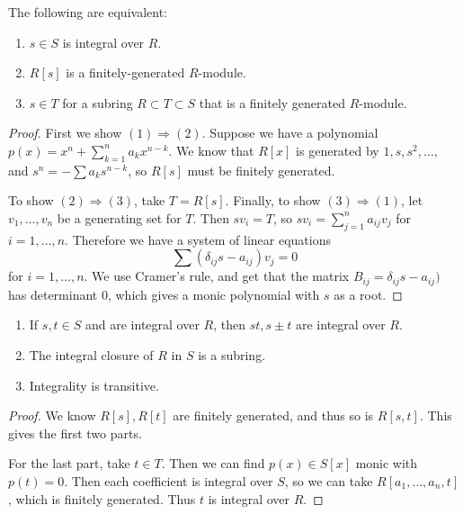\message{ !name(notes.tex)}\documentclass[10pt, twoside]{article}
\begin{document}
        \begin{prop}
            The following are equivalent:
            \begin{enumerate}
                \item $s \in S$ is integral over $R$.
                \item $R[s]$ is a finitely-generated $R$-module.
                \item $s \in T$ for a subring $R \subset T \subset S$ that is a finitely generated $R$-module.
            \end{enumerate}
            \begin{proof}
                First we show $(1) \Rightarrow (2)$. Suppose we have a polynomial $p(x) = x^n + \sum_{k=1}^n a_kx^{n-k}$. We know that $R[x]$ is generated by $1,s,s^2, \ldots,$ and $s^n = - \sum a_k s^{n-k}$, so $R[s]$ must be finitely generated.

                To show $(2) \Rightarrow (3)$, take $T = R[s]$. Finally, to show $(3) \Rightarrow (1)$, let $v_1, \ldots, v_n$ be a generating set for $T$. Then $sv_i = T$, so $sv_i = \sum_{j=1}^n a_{ij}v_j$ for $i = 1, \ldots, n$. Therefore we have a system of linear equations \[\sum (\delta_{ij}s - a_{ij}) v_j = 0 \] for $i = 1, \ldots, n$. We use Cramer's rule, and get that the matrix $B_{ij} = \delta_{ij}s - a_{ij})$ has determinant $0$, which gives a monic polynomial with $s$ as a root.
            \end{proof}
        \end{prop}

        \begin{cor}
            \begin{enumerate}
                \item If $s,t \in S$ and are integral over $R$, then $st,s\pm t$ are integral over $R$.
                \item The integral closure of $R$ in $S$ is a subring.
                \item Integrality is transitive.
            \end{enumerate}
            \begin{proof}
                We know $R[s],R[t]$ are finitely generated, and thus so is $R[s,t]$. This gives the first two parts.

                For the last part, take $t \in T$. Then we can find $p(x) \in S[x]$ monic with $p(t) = 0$. Then each coefficient is integral over $S$, so we can take $R[a_1, \ldots, a_n,t]$, which is finitely generated. Thus $t$ is integral over $R$.
            \end{proof}
        \end{cor}
\end{document}
